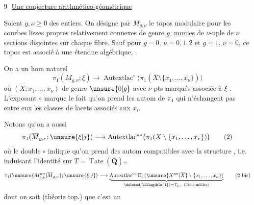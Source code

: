 \textcircled{9} \uline{Une conjecture arithmético-géométrique}

Soient $g,\nu\geq0$ des entiers. On désigne par $M_{g,\nu}$ le topos modulaire  pour les courbes  lisses propres relativement connexes de genre $g$, \uline{munies} de  $\nu$-uple de $\nu$ sections disjointes sur chaque fibre. Sauf pour $g=0$, $\nu=0,1,2$ et $g=1$, $\nu=0$, ce topos est associé à une étendue algébrique, .

On a un hom naturel 
\[
\pi_1(M_{g,\nu};\xi)\longrightarrow\operatorname{Autextlac}^{\circ}\bigl(\pi_1(\overline X\setminus\{x_1,\ldots,x_\nu\})\bigr)\tag{1}
\]
où $(X;x_1,\ldots,x_\nu)$   de genre $\unsure{0|g}$ avec $\nu$ pts marqués associée à $\xi$ .  L'exposant $\circ$ marque le fait qu'on prend les autom de $\pi_1$ qui n'échangent pas entre eux les classes de lacets associés aux $x_i$.

Notons qu'on a aussi
\[
\pi_1(\overline M_{g,\nu};\unsure{\xi|j})\longrightarrow\operatorname{Autextlac}^{\circ\circ}\bigl(\pi_1(X\setminus\{x_1,\ldots,x_\nu\})\bigr)\tag{2}
\]
où le double $\circ$ indique qu'on prend des autom  compatibles avec la structure , i.e. induisant l'identité sur $T=\operatorname{Tate}(\overline{\mathbf Q})$\ldots
{}
\[
\pi_1(\unsure{M_{g,\nu}^{an}|\overline M_{g,\nu}};\unsure{\xi|j})\longrightarrow
\underbrace{\operatorname{Autextlac}^{\circ\circ}\Pi_1(\unsure{X^{an}|\overline X}\setminus\{x_1,\ldots,x_\nu\})}_{\deleted{\illegible{1}}=\mathcal T_{g,\nu}\ (\text{Teichmüller})}\tag{2 bis}
\]
dont on sait (théorie top.) que c'est un

